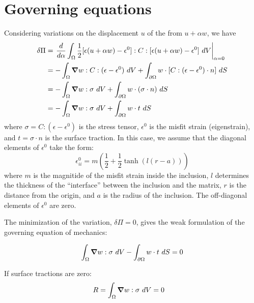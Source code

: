 \documentclass[10pt]{article}
\newcommand{\gv}[1]{\ensuremath{\mbox{\boldmath$ #1 $}}}
\newcommand{\grad}[1]{\gv{\nabla} #1}
\begin{document}
\section{Governing equations}
Considering variations on the displacement $u$ of the from $u+\alpha w$, we have
\begin{align}
\delta \Pi &=  \left. \frac{d}{d\alpha} \int_{\Omega}    \frac{1}{2} [\epsilon(u+\alpha w) - \epsilon^0] : C : [\epsilon(u+\alpha w) - \epsilon^0] ~dV \right\vert_{\alpha=0} \\
&=  -\int_{\Omega}   \grad w : C :  (\epsilon-\epsilon^0)  ~dV +  \int_{\partial \Omega}   w \cdot [C :  (\epsilon-\epsilon^0) \cdot n]  ~dS\\
&=  -\int_{\Omega}   \grad w : \sigma  ~dV +  \int_{\partial \Omega}   w \cdot (\sigma \cdot n)  ~dS\\
&=  -\int_{\Omega}   \grad w : \sigma  ~dV +  \int_{\partial \Omega}   w \cdot t  ~dS
\end{align}
where $\sigma = C : (\epsilon-\epsilon^0)$ is the stress tensor, $\epsilon^0$ is the misfit strain (eigenstrain), and $t=\sigma \cdot n$ is the surface traction. In this case, we assume that the diagonal elements of $\epsilon^0$ take the form:
\begin{equation}
\epsilon^0_{ii} = m \left(\frac{1}{2} + \frac{1}{2} \tanh(l(r-a)) \right)
\end{equation}
where $m$ is the magnitide of the misfit strain inside the inclusion, $l$ determines the thickness of the ``interface'' between the inclusion and the matrix, $r$ is the distance from the origin, and $a$ is the radius of the inclusion. The off-diagonal elements of $\epsilon^0$ are zero.

The minimization of the variation, $\delta \Pi=0$, gives the weak formulation of the governing equation of mechanics:

\begin{align}
\int_{\Omega}   \grad w : \sigma  ~dV -  \int_{\partial \Omega}   w \cdot t  ~dS = 0
\end{align}

If surface tractions are zero: \\
\begin{align}
R &=  \int_{\Omega}   \grad w :  \sigma ~dV = 0 
\end{align}
\end{document}
